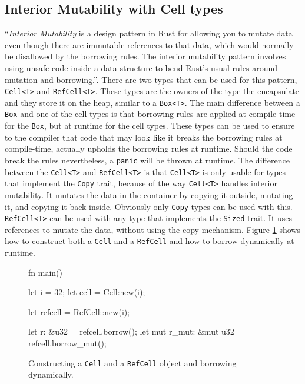 \documentclass[twocolumn]{article}
\begin{document}
\subsection{Interior Mutability with Cell types}
\label{interior-mutability}
``\textit{Interior Mutability} is a design pattern in Rust for allowing you to mutate data even though there are immutable references to that data, which would normally be disallowed by the borrowing rules. The interior mutability pattern involves using unsafe code inside a data structure to bend Rust's usual rules around mutation and borrowing.''\cite{RustBook-InteriorMutability}.
There are two types that can be used for this pattern, \texttt{Cell<T>} and \texttt{RefCell<T>}.
These types are the owners of the type the encapsulate and they store it on the heap, similar to a \texttt{Box<T>}.
The main difference between a \texttt{Box} and one of the cell types is that borrowing rules are applied at compile-time for the \texttt{Box}, but at runtime for the cell types.
These types can be used to ensure to the compiler that code that may look like it breaks the borrowing rules at compile-time, actually upholds the borrowing rules at runtime.
Should the code break the rules nevertheless, a \texttt{panic} will be thrown at runtime.
The difference between the \texttt{Cell<T>} and \texttt{RefCell<T>} is that \texttt{Cell<T>} is only usable for types that implement the \texttt{Copy} trait, because of the way \texttt{Cell<T>} handles interior mutability.
It mutates the data in the container by copying it outside, mutating it, and copying it back inside.
Obviously only \texttt{Copy}-types can be used with this.
\texttt{RefCell<T>} can be used with any type that implements the \texttt{Sized} trait.
It uses references to mutate the data, without using the copy mechanism.
Figure \ref{mutability-refcell} shows how to construct both a \texttt{Cell} and a \texttt{RefCell} and how to borrow dynamically at runtime.
\begin{figure}
\begin{rustcode}
fn main() {
    let i = 32;
    let cell = Cell:new(i);

    let refcell = RefCell::new(i);

    let r: &u32 = refcell.borrow();
    let mut r_mut: &mut u32
        = refcell.borrow_mut();
}
\end{rustcode}
\vspace{-2em}
\caption{Constructing a \texttt{Cell} and a \texttt{RefCell} object and borrowing dynamically.}
\label{mutability-refcell}
\end{figure}
\end{document}
